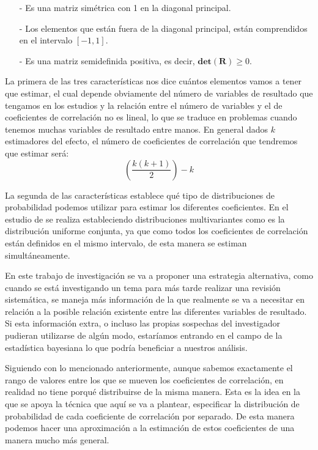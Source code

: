 \documentclass[a4paper,openright,12pt]{report}
\begin{document}
\begin{itemize}
\item[-] Es una matriz simétrica con 1 en la diagonal principal.
\item[-] Los elementos que están fuera de la diagonal principal, están comprendidos en el intervalo $[-1,1]$.
\item[-] Es una matriz semidefinida positiva, es decir, $\mathbf{det}(\mathbf{R})\geq 0$. 
\end{itemize}

La primera de las tres características nos dice cuántos elementos vamos a tener que estimar, el cual depende obviamente del número de variables de resultado que tengamos en los estudios y la relación entre el número de variables y el de coeficientes de correlación no es lineal, lo que se traduce en problemas cuando tenemos muchas variables de resultado entre manos.
En general dados $k$ estimadores del efecto, el número de coeficientes de correlación que tendremos que estimar será: $$(\dfrac{k(k+1)}{2})-k$$

La segunda de las características establece qué tipo de distribuciones de probabilidad podemos utilizar para estimar los diferentes coeficientes. En el estudio de \cite{Barnard2000} se realiza estableciendo distribuciones multivariantes como es la distribución uniforme conjunta, ya que como todos los coeficientes de correlación están definidos en el mismo intervalo, de esta manera se estiman simultáneamente. 

En este trabajo de investigación se va a proponer una estrategia alternativa, como cuando se está investigando un tema para más tarde realizar una revisión sistemática, se maneja más información de la que realmente se va a necesitar en relación a la posible relación existente entre las diferentes variables de resultado. Si esta información extra, o incluso las propias sospechas del investigador pudieran utilizarse de algún modo, estaríamos entrando en el campo de la estadística bayesiana lo que podría beneficiar a nuestros análisis.

Siguiendo con lo mencionado anteriormente, aunque sabemos exactamente el rango de valores entre los que se mueven los coeficientes de correlación, en realidad no tiene porqué distribuirse de la misma manera. Esta es la idea en la que se apoya la técnica que aquí se va a plantear, especificar la distribución de probabilidad de cada coeficiente de correlación por separado. De esta manera podemos hacer una aproximación a la estimación de estos coeficientes de una manera mucho más general.
\end{document}
